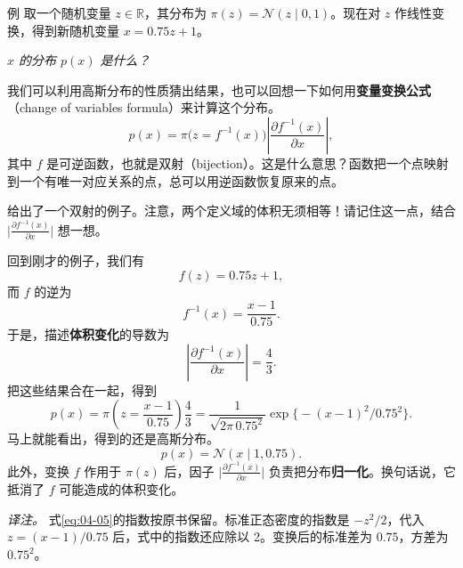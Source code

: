 \begin{booknote}{例}
取一个随机变量 $z\in\mathbb{R}$，其分布为 $\pi(z)=\mathcal{N}(z\mid 0,1)$。现在对 $z$ 作线性变换，得到新随机变量 $x=0.75z+1$。

\begin{center}
\emph{$x$ 的分布 $p(x)$ 是什么？}
\end{center}

我们可以利用高斯分布的性质猜出结果，也可以回想一下如何用\textbf{变量变换公式}（change of variables formula）来计算这个分布。
\begin{equation}
p(x)=\pi\bigl(z=f^{-1}(x)\bigr)\left|\frac{\partial f^{-1}(x)}{\partial x}\right|,
\tag{4.1}\label{eq:04-01}
\end{equation}
其中 $f$ 是可逆函数，也就是双射（bijection）。这是什么意思？函数把一个点映射到一个有唯一对应关系的点，总可以用逆函数恢复原来的点。

给出了一个双射的例子。注意，两个定义域的体积无须相等！请记住这一点，结合 $\bigl|\frac{\partial f^{-1}(x)}{\partial x}\bigr|$ 想一想。

回到刚才的例子，我们有
\begin{equation}
f(z)=0.75z+1,
\tag{4.2}\label{eq:04-02}
\end{equation}
而 $f$ 的逆为
\begin{equation}
f^{-1}(x)=\frac{x-1}{0.75}.
\tag{4.3}\label{eq:04-03}
\end{equation}
于是，描述\textbf{体积变化}的导数为
\begin{equation}
\left|\frac{\partial f^{-1}(x)}{\partial x}\right|=\frac{4}{3}.
\tag{4.4}\label{eq:04-04}
\end{equation}
把这些结果合在一起，得到
\begin{equation}
p(x)=\pi\left(z=\frac{x-1}{0.75}\right)\frac{4}{3}
=\frac{1}{\sqrt{2\pi\,0.75^2}}\exp\bigl\{-(x-1)^2/0.75^2\bigr\}.
\tag{4.5}\label{eq:04-05}
\end{equation}
马上就能看出，得到的还是高斯分布。
\begin{equation}
p(x)=\mathcal{N}(x\mid 1,0.75).
\tag{4.6}\label{eq:04-06}
\end{equation}
此外，变换 $f$ 作用于 $\pi(z)$ 后，因子 $\bigl|\frac{\partial f^{-1}(x)}{\partial x}\bigr|$ 负责把分布\textbf{归一化}。换句话说，它抵消了 $f$ 可能造成的体积变化。

\emph{译注。} 式\eqref{eq:04-05}的指数按原书保留。标准正态密度的指数是 $-z^2/2$，代入 $z=(x-1)/0.75$ 后，式中的指数还应除以 2。变换后的标准差为 $0.75$，方差为 $0.75^2$。
\end{booknote}


